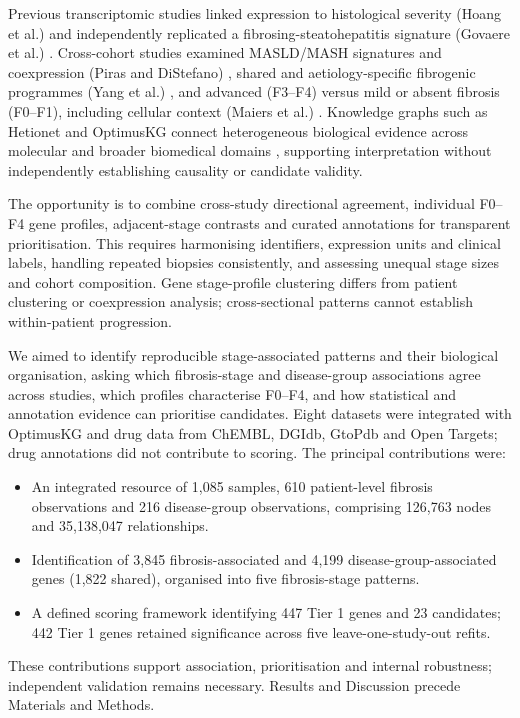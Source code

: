 \documentclass[11pt,a4paper]{article}
\begin{document}
Previous transcriptomic studies linked expression to histological severity (Hoang et al.) \cite{ref4} and independently replicated a fibrosing-steatohepatitis signature (Govaere et al.) \cite{govaere2020}. Cross-cohort studies examined MASLD/MASH signatures and coexpression (Piras and DiStefano) \cite{piras2024}, shared and aetiology-specific fibrogenic programmes (Yang et al.) \cite{yang2026}, and advanced (F3--F4) versus mild or absent fibrosis (F0--F1), including cellular context (Maiers et al.) \cite{maiers2026}. Knowledge graphs such as Hetionet and OptimusKG connect heterogeneous biological evidence across molecular and broader biomedical domains \cite{himmelstein2017,ref5}, supporting interpretation without independently establishing causality or candidate validity.

The opportunity is to combine cross-study directional agreement, individual F0--F4 gene profiles, adjacent-stage contrasts and curated annotations for transparent prioritisation. This requires harmonising identifiers, expression units and clinical labels, handling repeated biopsies consistently, and assessing unequal stage sizes and cohort composition. Gene stage-profile clustering differs from patient clustering or coexpression analysis; cross-sectional patterns cannot establish within-patient progression.

We aimed to identify reproducible stage-associated patterns and their biological organisation, asking which fibrosis-stage and disease-group associations agree across studies, which profiles characterise F0--F4, and how statistical and annotation evidence can prioritise candidates. Eight datasets were integrated with OptimusKG and drug data from ChEMBL, DGIdb, GtoPdb and Open Targets; drug annotations did not contribute to scoring. The principal contributions were:
\begin{itemize}
\item An integrated resource of 1,085 samples, 610 patient-level fibrosis observations and 216 disease-group observations, comprising 126,763 nodes and 35,138,047 relationships.
\item Identification of 3,845 fibrosis-associated and 4,199 disease-group-associated genes (1,822 shared), organised into five fibrosis-stage patterns.
\item A defined scoring framework identifying 447 Tier 1 genes and 23 candidates; 442 Tier 1 genes retained significance across five leave-one-study-out refits.
\end{itemize}
These contributions support association, prioritisation and internal robustness; independent validation remains necessary. Results and Discussion precede Materials and Methods.
\end{document}

